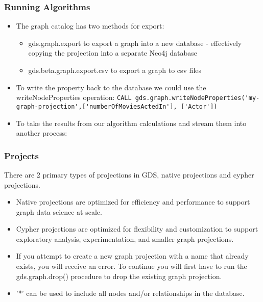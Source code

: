 \begin{frame}[fragile]\frametitle{Running Algorithms}

\begin{itemize}
\item The graph catalog has two methods for export:
\begin{itemize}
\item gds.graph.export to export a graph into a new database - effectively copying the projection into a separate Neo4j database
\item 
gds.beta.graph.export.csv to export a graph to csv files
\end{itemize}

\item  To write the property back to the database we could use the writeNodeProperties operation: \lstinline|CALL gds.graph.writeNodeProperties('my-graph-projection',['numberOfMoviesActedIn'], ['Actor'])|
\item To take the results from our algorithm calculations and stream them into another process:
\end{itemize}


\end{frame}


\begin{frame}[fragile]\frametitle{Projects}

There are 2 primary types of projections in GDS, native projections and cypher projections.

\begin{itemize}
\item Native projections are optimized for efficiency and performance to support graph data science at scale.
\item Cypher projections are optimized for flexibility and customization to support exploratory analysis, experimentation, and smaller graph projections.
\item If you attempt to create a new graph projection with a name that already exists, you will receive an error. To continue you will first have to run the gds.graph.drop() procedure to drop the existing graph projection.
\item '*' can be used to include all nodes and/or relationships in the database.
\end{itemize}

\end{frame}


